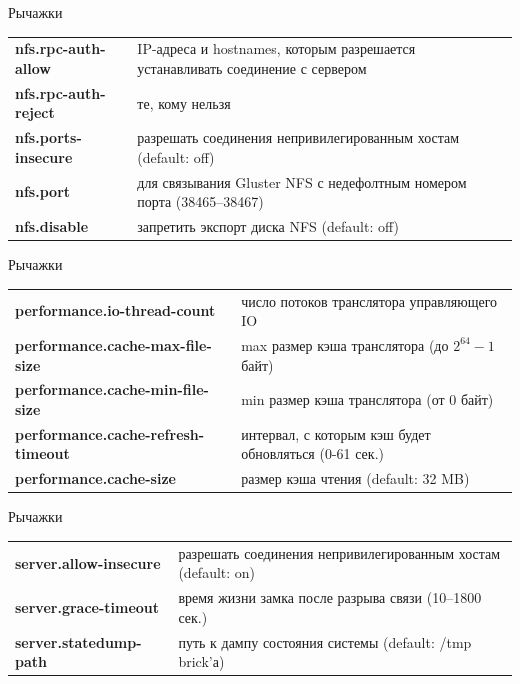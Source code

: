 \documentclass{beamer}
\begin{document}
\begin{frame}{Рычажки}
	\begin{block}{}
		\begin{tabular}{ p{6cm} p{5cm} }
			\textbf{nfs.rpc-auth-allow} & IP-адреса и hostnames, которым разрешается устанавливать соединение с сервером \\
			\textbf{nfs.rpc-auth-reject} & те, кому нельзя \\
			\textbf{nfs.ports-insecure} & разрешать соединения непривилегированным хостам (default: off) \\
			\textbf{nfs.port} & для связывания Gluster NFS с недефолтным номером порта (38465--38467)\\
			\textbf{nfs.disable} & запретить экспорт диска NFS (default: off) \\
		\end{tabular}
	\end{block}
\end{frame}



\begin{frame}{Рычажки}
	\begin{block}{}
		\begin{tabular}{ p{6cm} p{5cm} }
			\textbf{performance.io-thread-count} & число потоков транслятора управляющего IO \\ %
			\textbf{performance.cache-max-file-size} & max размер кэша транслятора (до $2^{64} - 1$ байт)\\
			\textbf{performance.cache-min-file-size} & min размер кэша транслятора (от 0 байт)\\		
			\textbf{performance.cache-refresh-timeout} & интервал, с которым кэш будет обновляться (0-61 сек.) \\
			\textbf{performance.cache-size} & размер кэша чтения (default: 32 MB) \\
		\end{tabular}
	\end{block}
\end{frame}


\begin{frame}{Рычажки}
	\begin{block}{}
		\begin{tabular}{ p{6cm} p{5cm} }
			\textbf{server.allow-insecure} & разрешать соединения непривилегированным хостам (default: on) \\
			\textbf{server.grace-timeout} &  время жизни замка после разрыва связи (10--1800  сек.) \\
			\textbf{server.statedump-path} &  путь к дампу состояния системы (default: /tmp brick'а) \\		
		\end{tabular}
	\end{block}
\end{frame}
\end{document}
